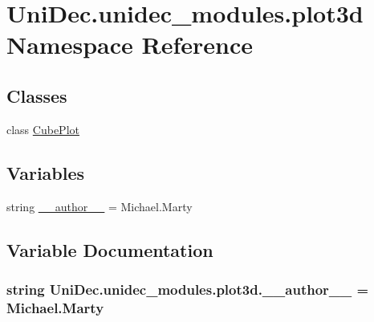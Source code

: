 \hypertarget{namespace_uni_dec_1_1unidec__modules_1_1plot3d}{}\section{Uni\+Dec.\+unidec\+\_\+modules.\+plot3d Namespace Reference}
\label{namespace_uni_dec_1_1unidec__modules_1_1plot3d}
\subsection*{Classes}
\begin{DoxyCompactItemize}
\item 
class \hyperlink{class_uni_dec_1_1unidec__modules_1_1plot3d_1_1_cube_plot}{Cube\+Plot}
\end{DoxyCompactItemize}
\subsection*{Variables}
\begin{DoxyCompactItemize}
\item 
string \hyperlink{namespace_uni_dec_1_1unidec__modules_1_1plot3d_a5315335b68b0827c89ab41d0358f173c}{\+\_\+\+\_\+author\+\_\+\+\_\+} = \textquotesingle{}Michael.\+Marty\textquotesingle{}
\end{DoxyCompactItemize}


\subsection{Variable Documentation}
\hypertarget{namespace_uni_dec_1_1unidec__modules_1_1plot3d_a5315335b68b0827c89ab41d0358f173c}{}
\subsubsection[{\+\_\+\+\_\+author\+\_\+\+\_\+}]{\setlength{\rightskip}{0pt plus 5cm}string Uni\+Dec.\+unidec\+\_\+modules.\+plot3d.\+\_\+\+\_\+author\+\_\+\+\_\+ = \textquotesingle{}Michael.\+Marty\textquotesingle{}}\label{namespace_uni_dec_1_1unidec__modules_1_1plot3d_a5315335b68b0827c89ab41d0358f173c}
